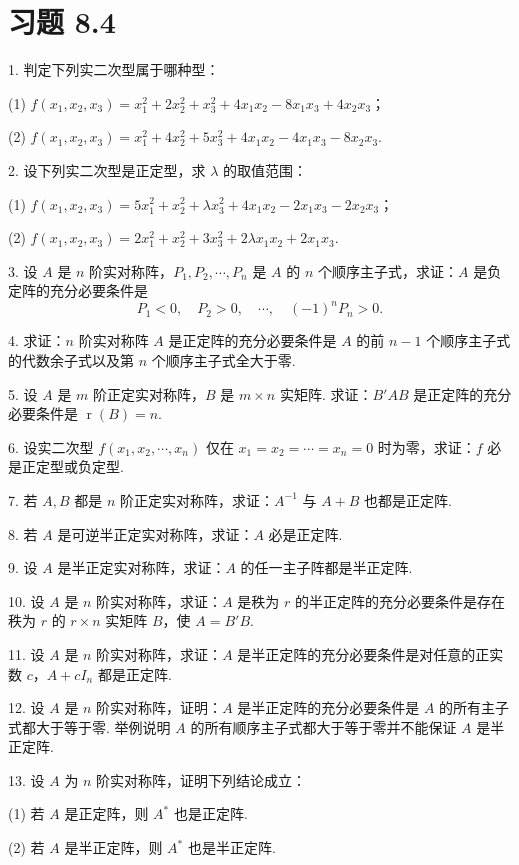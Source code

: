 \documentclass[UTF8,12pt,a4paper,fontset=fandol]{ctexart}
\begin{document}
\section*{习题 8.4}

1. 判定下列实二次型属于哪种型：

(1) $f(x_1,x_2,x_3)=x_1^2+2x_2^2+x_3^2+4x_1x_2-8x_1x_3+4x_2x_3$；

(2) $f(x_1,x_2,x_3)=x_1^2+4x_2^2+5x_3^2+4x_1x_2-4x_1x_3-8x_2x_3$.

2. 设下列实二次型是正定型，求 $\lambda$ 的取值范围：

(1) $f(x_1,x_2,x_3)=5x_1^2+x_2^2+\lambda x_3^2+4x_1x_2-2x_1x_3-2x_2x_3$；

(2) $f(x_1,x_2,x_3)=2x_1^2+x_2^2+3x_3^2+2\lambda x_1x_2+2x_1x_3$.

3. 设 $A$ 是 $n$ 阶实对称阵，$P_1,P_2,\cdots,P_n$ 是 $A$ 的 $n$ 个顺序主子式，求证：$A$ 是负定阵的充分必要条件是
\[
P_1<0,\quad P_2>0,\quad \cdots,\quad (-1)^nP_n>0.
\]

4. 求证：$n$ 阶实对称阵 $A$ 是正定阵的充分必要条件是 $A$ 的前 $n-1$ 个顺序主子式的代数余子式以及第 $n$ 个顺序主子式全大于零.

5. 设 $A$ 是 $m$ 阶正定实对称阵，$B$ 是 $m\times n$ 实矩阵. 求证：$B'AB$ 是正定阵的充分必要条件是 $\operatorname{r}(B)=n$.

6. 设实二次型 $f(x_1,x_2,\cdots,x_n)$ 仅在 $x_1=x_2=\cdots=x_n=0$ 时为零，求证：$f$ 必是正定型或负定型.

7. 若 $A,B$ 都是 $n$ 阶正定实对称阵，求证：$A^{-1}$ 与 $A+B$ 也都是正定阵.

8. 若 $A$ 是可逆半正定实对称阵，求证：$A$ 必是正定阵.

9. 设 $A$ 是半正定实对称阵，求证：$A$ 的任一主子阵都是半正定阵.

10. 设 $A$ 是 $n$ 阶实对称阵，求证：$A$ 是秩为 $r$ 的半正定阵的充分必要条件是存在秩为 $r$ 的 $r\times n$ 实矩阵 $B$，使 $A=B'B$.

11. 设 $A$ 是 $n$ 阶实对称阵，求证：$A$ 是半正定阵的充分必要条件是对任意的正实数 $c$，$A+cI_n$ 都是正定阵.

12. 设 $A$ 是 $n$ 阶实对称阵，证明：$A$ 是半正定阵的充分必要条件是 $A$ 的所有主子式都大于等于零. 举例说明 $A$ 的所有顺序主子式都大于等于零并不能保证 $A$ 是半正定阵.

13. 设 $A$ 为 $n$ 阶实对称阵，证明下列结论成立：

(1) 若 $A$ 是正定阵，则 $A^*$ 也是正定阵.

(2) 若 $A$ 是半正定阵，则 $A^*$ 也是半正定阵.
\end{document}
